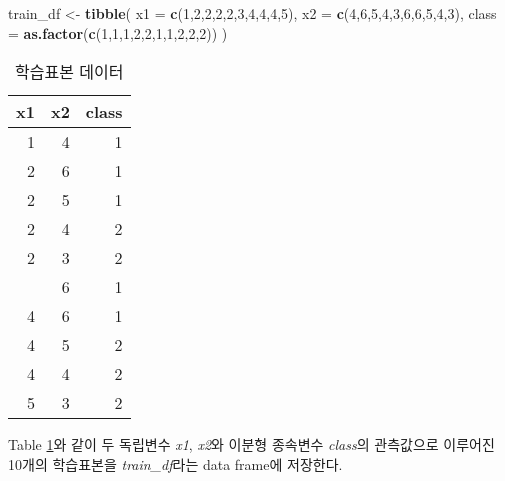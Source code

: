 \documentclass[]{book}
\newenvironment{Shaded}{\begin{snugshade}}{\end{snugshade}}
\newcommand{\DataTypeTok}[1]{\textcolor[rgb]{0.13,0.29,0.53}{#1}}
\newcommand{\DecValTok}[1]{\textcolor[rgb]{0.00,0.00,0.81}{#1}}
\newcommand{\KeywordTok}[1]{\textcolor[rgb]{0.13,0.29,0.53}{\textbf{#1}}}
\newcommand{\NormalTok}[1]{#1}
\newcommand{\StringTok}[1]{\textcolor[rgb]{0.31,0.60,0.02}{#1}}
\begin{document}
\begin{Shaded}
\begin{Highlighting}[]
\NormalTok{train_df <-}\StringTok{ }\KeywordTok{tibble}\NormalTok{(}
  \DataTypeTok{x1 =} \KeywordTok{c}\NormalTok{(}\DecValTok{1}\NormalTok{,}\DecValTok{2}\NormalTok{,}\DecValTok{2}\NormalTok{,}\DecValTok{2}\NormalTok{,}\DecValTok{2}\NormalTok{,}\DecValTok{3}\NormalTok{,}\DecValTok{4}\NormalTok{,}\DecValTok{4}\NormalTok{,}\DecValTok{4}\NormalTok{,}\DecValTok{5}\NormalTok{),}
  \DataTypeTok{x2 =} \KeywordTok{c}\NormalTok{(}\DecValTok{4}\NormalTok{,}\DecValTok{6}\NormalTok{,}\DecValTok{5}\NormalTok{,}\DecValTok{4}\NormalTok{,}\DecValTok{3}\NormalTok{,}\DecValTok{6}\NormalTok{,}\DecValTok{6}\NormalTok{,}\DecValTok{5}\NormalTok{,}\DecValTok{4}\NormalTok{,}\DecValTok{3}\NormalTok{),}
  \DataTypeTok{class =} \KeywordTok{as.factor}\NormalTok{(}\KeywordTok{c}\NormalTok{(}\DecValTok{1}\NormalTok{,}\DecValTok{1}\NormalTok{,}\DecValTok{1}\NormalTok{,}\DecValTok{2}\NormalTok{,}\DecValTok{2}\NormalTok{,}\DecValTok{1}\NormalTok{,}\DecValTok{1}\NormalTok{,}\DecValTok{2}\NormalTok{,}\DecValTok{2}\NormalTok{,}\DecValTok{2}\NormalTok{))}
\NormalTok{)}
\end{Highlighting}
\end{Shaded}

\begin{table}[t]

\caption{\label{tab:tree-train-data-table}학습표본 데이터}
\centering
\begin{tabular}{rrr}
\toprule
x1 & x2 & class\\
\midrule
1 & 4 & 1\\
2 & 6 & 1\\
2 & 5 & 1\\
2 & 4 & 2\\
2 & 3 & 2\\
\addlinespace
3 & 6 & 1\\
4 & 6 & 1\\
4 & 5 & 2\\
4 & 4 & 2\\
5 & 3 & 2\\
\bottomrule
\end{tabular}
\end{table}

Table \ref{tab:tree-train-data-table}와 같이 두 독립변수 \emph{x1}, \emph{x2}와 이분형 종속변수 \emph{class}의 관측값으로 이루어진 10개의 학습표본을 \emph{train\_df}라는 data frame에 저장한다.
\end{document}
